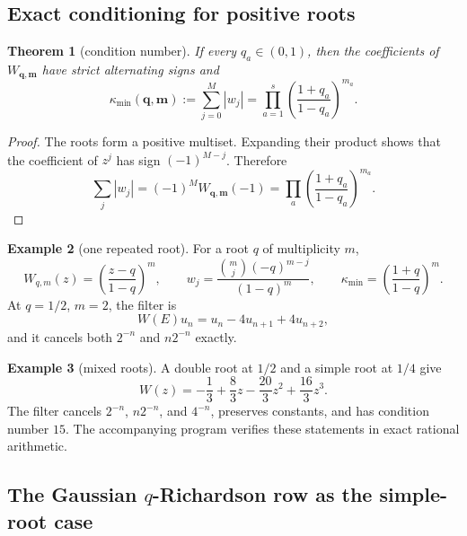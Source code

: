 \documentclass[11pt]{article}
\numberwithin{equation}{section}
\newtheorem{theorem}{Theorem}[section]
\theoremstyle{definition}
\newtheorem{example}[theorem]{Example}
\theoremstyle{remark}
\begin{document}
\subsection{Exact conditioning for positive roots}

\begin{theorem}[condition number]
\label{p6:thm:minimal-condition}
If every $q_a\in(0,1)$, then the coefficients of
$W_{\bm q,\bm m}$ have strict alternating signs and
\begin{equation}
 \kappa_{\min}(\bm q,\bm m)
 :=\sum_{j=0}^{M}|w_j|
 =\prod_{a=1}^{s}\left(\frac{1+q_a}{1-q_a}\right)^{m_a}.
 \label{p6:eq:minimal-condition}
\end{equation}
\end{theorem}

\begin{proof}
The roots form a positive multiset.  Expanding their product shows that the coefficient
of $z^j$ has sign $(-1)^{M-j}$.  Therefore
\[
 \sum_j|w_j|=(-1)^MW_{\bm q,\bm m}(-1)
 =\prod_a\left(\frac{1+q_a}{1-q_a}\right)^{m_a}.
\]
\end{proof}

\begin{example}[one repeated root]
For a root $q$ of multiplicity $m$,
\begin{equation}
 W_{q,m}(z)=\left(\frac{z-q}{1-q}\right)^m,
 \qquad
 w_j=\frac{\binom mj(-q)^{m-j}}{(1-q)^m},
 \qquad
 \kappa_{\min}=\left(\frac{1+q}{1-q}\right)^m.
 \label{p6:eq:single-root-filter}
\end{equation}
At $q=1/2$, $m=2$, the filter is
\[
 W(E)u_n=u_n-4u_{n+1}+4u_{n+2},
\]
and it cancels both $2^{-n}$ and $n2^{-n}$ exactly.
\end{example}

\begin{example}[mixed roots]
A double root at $1/2$ and a simple root at $1/4$ give
\begin{equation}
 W(z)=-\frac13+\frac83z-\frac{20}{3}z^2+\frac{16}{3}z^3.
 \label{p6:eq:mixed-filter}
\end{equation}
The filter cancels $2^{-n}$, $n2^{-n}$, and $4^{-n}$, preserves constants, and has
condition number $15$.  The accompanying program verifies these statements in exact
rational arithmetic.
\end{example}

\subsection{The Gaussian \texorpdfstring{$q$}{q}-Richardson row as the simple-root case}
\end{document}
